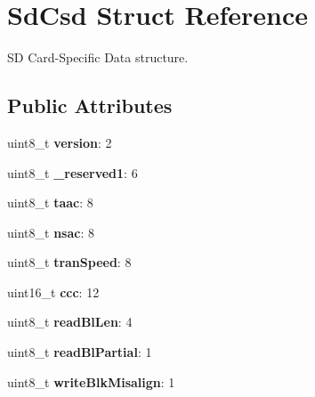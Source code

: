 \hypertarget{struct_sd_csd}{}\section{Sd\+Csd Struct Reference}
\label{struct_sd_csd}


SD Card-\/\+Specific Data structure.  


\subsection*{Public Attributes}
\begin{DoxyCompactItemize}
\item 
\mbox{\label{struct_sd_csd_a38887142a7b15bf54b2082092f8c8784}} 
uint8\+\_\+t {\bfseries version}\+: 2
\item 
\mbox{\label{struct_sd_csd_af91da518406dad96dfd13386fd47f9ee}} 
uint8\+\_\+t {\bfseries \+\_\+reserved1}\+: 6
\item 
\mbox{\label{struct_sd_csd_ae3a34a8bbcf79cad9d78674d1c850bc8}} 
uint8\+\_\+t {\bfseries taac}\+: 8
\item 
\mbox{\label{struct_sd_csd_ad99b4989c57a7ce428fbc3a809bd28c9}} 
uint8\+\_\+t {\bfseries nsac}\+: 8
\item 
\mbox{\label{struct_sd_csd_a41a489d630da13299ed6379c7b19e896}} 
uint8\+\_\+t {\bfseries tran\+Speed}\+: 8
\item 
\mbox{\label{struct_sd_csd_a004ba330fd26d4da867252d6b2c09bfa}} 
uint16\+\_\+t {\bfseries ccc}\+: 12
\item 
\mbox{\label{struct_sd_csd_abcd97c7dd77397f932ac7d0af1c09891}} 
uint8\+\_\+t {\bfseries read\+Bl\+Len}\+: 4
\item 
\mbox{\label{struct_sd_csd_ac8a797b25ef8f94bca62f9adea5b4bf9}} 
uint8\+\_\+t {\bfseries read\+Bl\+Partial}\+: 1
\item 
\mbox{\label{struct_sd_csd_a36d41621e9f3351be6ca8f5f6f8ab9c3}} 
uint8\+\_\+t {\bfseries write\+Blk\+Misalign}\+: 1
\item 

\end{DoxyCompactItemize}
